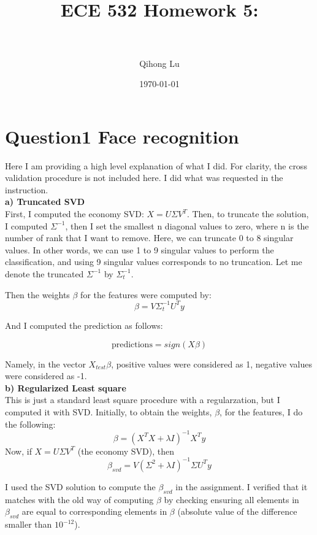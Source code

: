 \documentclass[paper=a4, fontsize=11pt]{scrartcl} %
\title{	
\normalfont \normalsize 
\horrule{0.5pt} \\[0.4cm] %
\huge ECE 532 Homework 5:\\ %
\horrule{2pt} \\[0.5cm] %
}
\author{Qihong Lu} %
\date{\normalsize\today} %
\numberwithin{equation}{section} %
\numberwithin{figure}{section} %
\numberwithin{table}{section} %
\begin{document}
\maketitle %


\section*{Question1 Face recognition}

Here I am providing a high level explanation of what I did. For clarity, the cross validation procedure is not included here. I did what was requested in the instruction. \\ 

\textbf{a) Truncated SVD}\\
First, I computed the economy SVD: $X = U \Sigma V^T$. Then, to truncate the solution, I computed  $\Sigma^{-1}$, then I set the smallest n diagonal values to zero, where n is the number of rank that I want to remove. Here, we can truncate 0 to 8 singular values. In other words, we can use 1 to 9 singular values to perform the classification, and using 9 singular values corresponds to no truncation. Let me denote the truncated $\Sigma^{-1}$ by $\Sigma_t^{-1}$. 

Then the weights $\beta$ for the features were computed by: 
$$\beta = V \Sigma_t^{-1} U^T y$$

And I computed the prediction as follows: 

$$\text{predictions} = sign(X \beta)$$

Namely, in the vector $X_{test} \beta$, positive values were considered as 1, negative values were considered as -1.\\


\textbf{b) Regularized Least square}\\
This is just a standard least square procedure with a regularzation, but I computed it with SVD. Initially, to obtain the weights, $\beta$, for the features, I do the following: 
$$ \beta = (X^T X + \lambda I)^{-1} X^T y $$ 
Now, if $X = U \Sigma V^T$ (the economy SVD), then 
$$ \beta_{svd} = V (\Sigma^2 + \lambda I)^{-1} \Sigma  U^T y $$ 

I used the SVD solution to compute the $\beta_{svd}$ in the assignment. I verified that it matches with the old way of computing $\beta$ by checking ensuring all elements in $\beta_{svd}$ are equal to corresponding elements in $\beta$ (absolute value of the difference smaller than $10^{-12}$). \\
\end{document}
